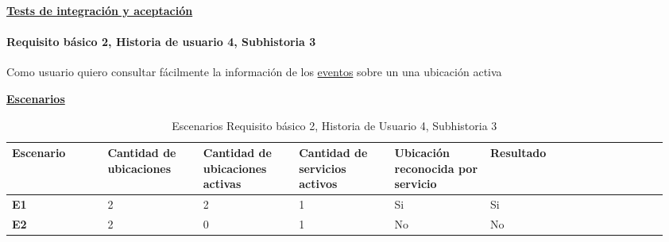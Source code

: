 \documentclass[../ei103948-project-documentation.tex]{subfiles}
\begin{document}
						\begin{center}
							\textbf{\underline{Tests de integración y aceptación}}
						\end{center}
	
						\testBasicoQ

						\vspace*{5mm}

					\paragraph*{Requisito básico 2, Historia de usuario 4, Subhistoria 3}
					Como usuario quiero consultar fácilmente la información de los \underline{eventos} sobre un una ubicación activa

					\begin{center}
						\textbf{\underline{Escenarios}}
						\begin{table}[H]
							\centering
							\begin{tabular}{|p{0.14\linewidth}|p{0.14\linewidth}|p{0.14\linewidth}|p{0.14\linewidth}|p{0.14\linewidth}|p{0.14\linewidth}|p{0.12\linewidth}|}
								\hline
								\textbf{Escenario} & \textbf{Cantidad de ubicaciones} & \textbf{Cantidad de ubicaciones activas} & \textbf{Cantidad de servicios activos} & \textbf{Ubicación reconocida por servicio} & \textbf{Resultado} \\ \hline
								\textbf{E1}        & 2                                & 2                                        & 1                                      & Si                                         & Si                 \\ \hline
								\textbf{E2}        & 2                                & 0                                        & 1                                      & No                                         & No                 \\ \hline
								\end{tabular}
							\caption{Escenarios Requisito básico 2, Historia de Usuario 4, Subhistoria 3}
						\end{table}

						\descripcionBasicaR

						\newpage


\end{center}
\end{document}
